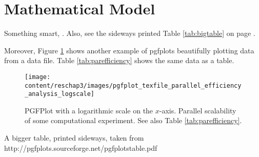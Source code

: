 \section{Mathematical Model}
Something smart, \cite{DoeJane2001}. Also, see the sideways printed Table \ref{tab:bigtable} on page \pageref{tab:bigtable}.

Moreover, Figure \ref{fig:parefficiency} shows another example of pgfplots beautifully plotting data from a data file. Table \ref{tab:parefficiency} shows the same data as a table.



\begin{figure}[h]
 \centering
 \texttt{[image: content/reschap3/images/pgfplot\_texfile\_parallel\_efficiency\_analysis\_logscale]}
 \caption{PGFPlot with a logarithmic scale on the $x$-axis. Parallel scalability of some computational experiment. See also Table \ref{tab:parefficiency}.}
 \label{fig:parefficiency}
\end{figure}

\begin{sidewaystable}[p]
 \centering
 \caption[A bigger table, printed sideways]{A bigger table, printed sideways, taken from http://pgfplots.sourceforge.net/pgfplotstable.pdf}
 \label{tab:bigtable}
\end{sidewaystable}
